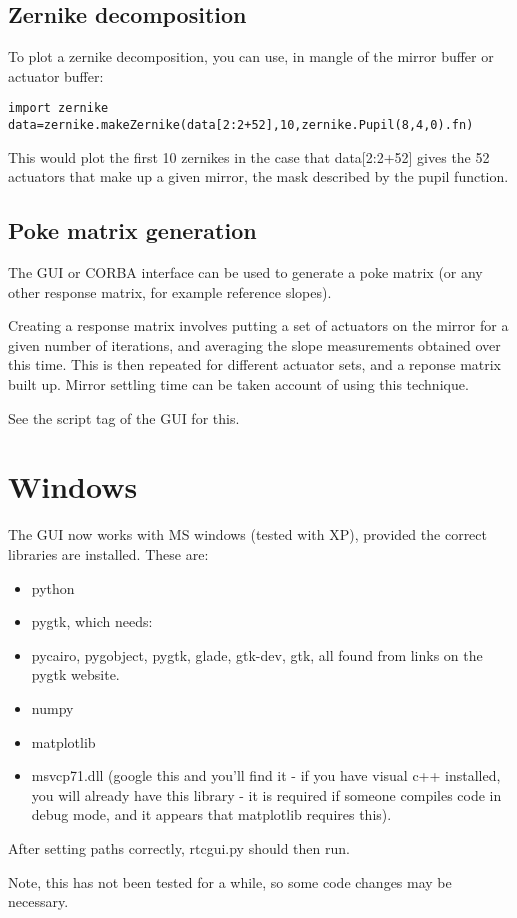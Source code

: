 \documentclass[a4,10pt]{article}
\begin{document}
\subsection{Zernike decomposition}
To plot a zernike decomposition, you can use, in mangle of the mirror
buffer or actuator buffer:
\begin{verbatim}
import zernike
data=zernike.makeZernike(data[2:2+52],10,zernike.Pupil(8,4,0).fn)
\end{verbatim}
This would plot the first 10 zernikes in the case that data[2:2+52]
gives the 52 actuators that make up a given mirror, the mask described
by the pupil function.

\subsection{Poke matrix generation}
The GUI or CORBA interface can be used to generate a poke matrix (or
any other response matrix, for example reference slopes).

Creating a response matrix involves putting a set of actuators on the
mirror for a given number of iterations, and averaging the slope
measurements obtained over this time.  This is then repeated for
different actuator sets, and a reponse matrix built up.  Mirror
settling time can be taken account of using this technique.

See the script tag of the GUI for this.





\section{Windows}
The GUI now works with MS windows (tested with XP), provided the
correct libraries are installed.  These are:
\begin{itemize}
\item python
\item pygtk, which needs:
\item pycairo, pygobject, pygtk, glade, gtk-dev, gtk, all found from links
on the pygtk website.
\item numpy
\item matplotlib
\item msvcp71.dll (google this and you'll find it - if you have visual c++
installed, you will already have this library - it is required if
someone compiles code in debug mode, and it appears that matplotlib
requires this).
\end{itemize}
After setting paths correctly, rtcgui.py should then run.

Note, this has not been tested for a while, so some code changes may
be necessary.
\end{document}
